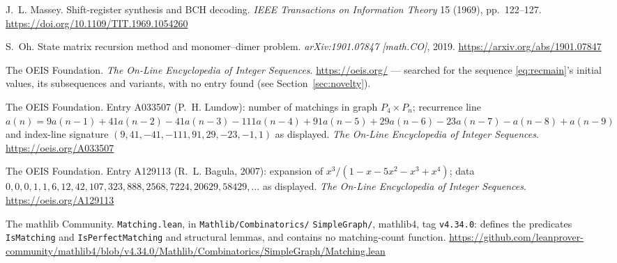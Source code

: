 \documentclass[11pt]{article}
\theoremstyle{definition}
\begin{document}
\begin{thebibliography}{9}
J.~L. Massey.
\newblock Shift-register synthesis and BCH decoding.
\newblock \emph{IEEE Transactions on Information Theory} 15 (1969),
pp.~122--127.
\url{https://doi.org/10.1109/TIT.1969.1054260}

S.~Oh.
\newblock State matrix recursion method and monomer--dimer problem.
\newblock \emph{arXiv:1901.07847 [math.CO]}, 2019.
\url{https://arxiv.org/abs/1901.07847}

The OEIS Foundation.
\newblock \emph{The On-Line Encyclopedia of Integer Sequences}.
\newblock \url{https://oeis.org/} --- searched for the sequence
\eqref{eq:recmain}'s initial values, its subsequences and variants, with no
entry found (see Section~\ref{sec:novelty}).

The OEIS Foundation.
\newblock Entry A033507 (P.~H. Lundow): number of matchings in graph
$P_4 \times P_n$; recurrence line
$a(n) = 9a(n-1) + 41a(n-2) - 41a(n-3) - 111a(n-4) + 91a(n-5) + 29a(n-6)
- 23a(n-7) - a(n-8) + a(n-9)$ and index-line signature
$(9, 41, -41, -111, 91, 29, -23, -1, 1)$ as displayed.
\newblock \emph{The On-Line Encyclopedia of Integer Sequences}.
\url{https://oeis.org/A033507}

The OEIS Foundation.
\newblock Entry A129113 (R.~L. Bagula, 2007): expansion of
$x^3/(1-x-5x^2-x^3+x^4)$; data
$0, 0, 0, 1, 1, 6, 12, 42, 107, 323, 888, 2568, 7224, 20629, 58429, \dots$
as displayed.
\newblock \emph{The On-Line Encyclopedia of Integer Sequences}.
\url{https://oeis.org/A129113}

The mathlib Community.
\newblock \texttt{Matching.lean}, in \texttt{Mathlib/Combinatorics/}
\newblock \texttt{SimpleGraph/}, mathlib4, tag \texttt{v4.34.0}: defines the
predicates \texttt{IsMatching} and \texttt{IsPerfectMatching} and structural
lemmas, and contains no matching-count function.
\newblock \url{https://github.com/leanprover-community/mathlib4/blob/v4.34.0/Mathlib/Combinatorics/SimpleGraph/Matching.lean}
\end{thebibliography}
\end{document}
